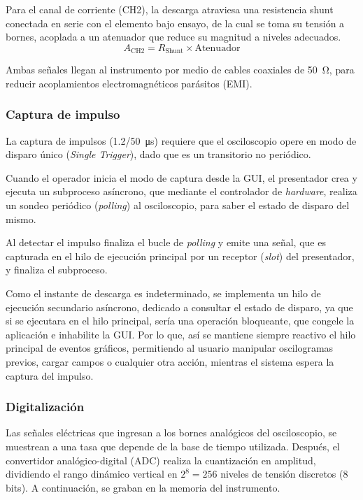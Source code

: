 Para el canal de corriente (CH2), la descarga atraviesa una resistencia shunt conectada en serie con el elemento bajo ensayo, de la cual se toma su tensión a bornes, acoplada a un atenuador que reduce su magnitud a niveles adecuados.
\begin{equation}
    \label{eq:atenuacion_corriente}
    A_{\text{CH2}} = R_\text{Shunt} \times \text{Atenuador}
\end{equation}

Ambas señales llegan al instrumento por medio de cables coaxiales de \qty{50}{\ohm}, para reducir acoplamientos electromagnéticos parásitos (EMI).

\subsubsection{Captura de impulso}
\label{subsec:captura_impulso}

La captura de impulsos (\qty[parse-numbers=false]{1.2/50}{\micro\second}) requiere que el osciloscopio opere en modo de disparo único (\emph{Single Trigger}), dado que es un transitorio no periódico.

Cuando el operador inicia el modo de captura desde la GUI, el presentador crea y ejecuta un subproceso asíncrono, que mediante el controlador de \emph{hardware}, realiza un sondeo periódico (\emph{polling}) al osciloscopio, para saber el estado de disparo del mismo.

Al detectar el impulso finaliza el bucle de \emph{polling} y emite una señal, que es capturada en el hilo de ejecución principal por un receptor (\emph{slot}) del presentador, y finaliza el subproceso.

Como el instante de descarga es indeterminado, se implementa un hilo de ejecución secundario asíncrono, dedicado a consultar el estado de disparo, ya que si se ejecutara en el hilo principal, sería una operación bloqueante, que congele la aplicación e inhabilite la GUI. Por lo que, así se mantiene siempre reactivo el hilo principal de eventos gráficos, permitiendo al usuario manipular oscilogramas previos, cargar campos o cualquier otra acción, mientras el sistema espera la captura del impulso.

\subsubsection{Digitalización}

Las señales eléctricas que ingresan a los bornes analógicos del osciloscopio, se muestrean a una tasa que depende de la base de tiempo utilizada. Después, el convertidor analógico-digital (ADC) realiza la cuantización en amplitud, dividiendo el rango dinámico vertical en $2^8 = 256$ niveles de tensión discretos (\num{8} bits). A continuación, se graban en la memoria del instrumento.


